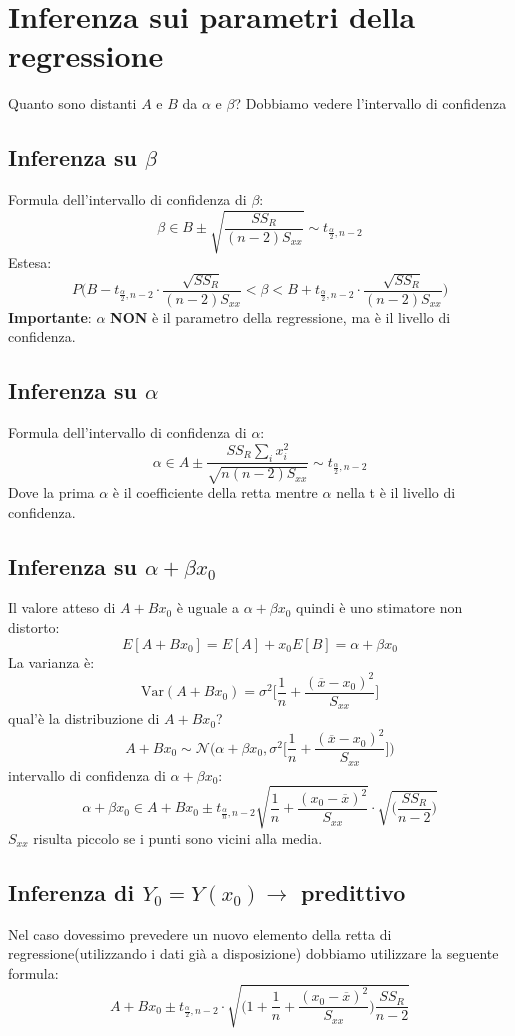 \documentclass[]{article}
\begin{document}
    \section{Inferenza sui parametri della regressione}\label{sec:inferenza-sui-parametri-della-regressione}
    Quanto sono distanti $A$ e $B$ da $\alpha$ e $\beta$?
    Dobbiamo vedere l'intervallo di confidenza
    \subsection{Inferenza su $\beta$}\label{sec:inferenza-su-beta}
    Formula dell'intervallo di confidenza di $\beta$:
    \[ \beta \in B \pm \sqrt{\frac{SS_R}{(n-2)S_{xx}}} \sim t_{\frac{\alpha}{2}, n-2} \]
    Estesa:
    \[ P\Big(B - t_{\frac{\alpha}{2},n-2} \cdot \frac{\sqrt{SS_R}}{(n-2)S_{xx}} < \beta < B + t_{\frac{\alpha}{2},n-2} \cdot \frac{\sqrt{SS_R}}{(n-2)S_{xx}}\Big) \]
    \textbf{Importante}: $\alpha$ \textbf{NON} è il parametro della regressione, ma è il livello di confidenza.
    \subsection{Inferenza su $\alpha$}\label{sec:inferenza-su-alpha}
    Formula dell'intervallo di confidenza di $\alpha$:
    \[ \alpha \in A \pm \frac{SS_R\sum_{i}{}x_i^2}{\sqrt{n(n-2)S_{xx}}} \sim t_{\frac{\alpha}{2},n-2} \]
    Dove la prima $\alpha$ è il coefficiente della retta mentre $\alpha$ nella t è il livello di confidenza.
    \subsection{Inferenza su $\alpha + \beta x_0$}\label{sec:inferenza-su-alpha--beta-x_0}
    Il valore atteso di $A + B x_0$ è uguale a $\alpha + \beta x_0$  quindi è uno stimatore non distorto:
    \[ E[A +B x_0] = E[A] + x_0E[B] = \alpha + \beta x_0 \]
    La varianza è:
    \[ \text{Var}(A+Bx_0) = \sigma^2 \Big[\frac{1}{n} + \frac{(\overline x - x_0)^2}{S_{xx}}  \Big] \]
    qual'è la distribuzione di $A+Bx_0$?
    \[ A+Bx_0 \sim \mathcal N \Big(\alpha+\beta x_0, \sigma^2 \Big[ \frac{1}{n} + \frac{(\overline x - x_0)^2}{S_{xx}} \Big]\Big) \]
    intervallo di confidenza di $\alpha + \beta x_0$:
    \[ \alpha + \beta x_0 \in A + B x_0 \pm t_{\frac{\alpha}{n}, n-2}\sqrt{\frac{1}{n} + \frac{(x_0- \overline x)^2}{S_{xx}}} \cdot \sqrt{\Big(\frac{SS_R}{n-2} \Big)} \]
    $S_{xx}$ risulta piccolo se i punti sono vicini alla media.
    \subsection{Inferenza di $Y_0 = Y(x_0) \rightarrow$ predittivo}\label{sec:inferenza-di-y_0--yx_0-rightarrow-predittivo}
    Nel caso dovessimo prevedere un nuovo elemento della retta di regressione(utilizzando i dati già a disposizione) dobbiamo utilizzare la seguente formula:
    \[ A+Bx_0 \pm t_{\frac{\alpha}{2},n-2} \cdot \sqrt{\Big(1+\frac{1}{n} + \frac{(x_0-\overline x)^2}{S_{xx}}\Big)\frac{SS_R}{n-2}} \]
\end{document}
